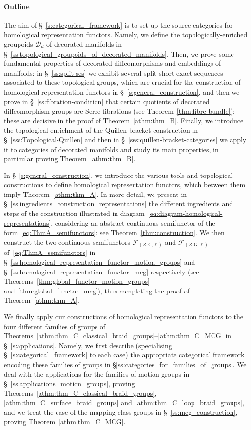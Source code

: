 \documentclass[AHL,Unicode,published]{cedram}
\newcommand{\sF}{\mathscr{F}}
\newcommand{\sG}{\mathsf{G}}
\newcommand{\cD}{\mathcal{D}}
\newcommand{\cF}{\mathcal{F}}
\begin{document}
\paragraph*{Outline}
The aim of \S~\ref{s:categorical_framework} is to set up the source categories for homological representation functors. Namely, we define the topologically-enriched groupoids $\cD_{d}$ of decorated manifolds in \S~\ref{ss:topological_groupoids_of_decorated_manifolds}. Then, we prove some fundamental properties of decorated diffeomorphisms and embeddings of manifolds: in \S~\ref{ss:split-ses} we exhibit several split short exact sequences associated to these topological groups, which are crucial for the construction of homological representation functors in \S~\ref{s:general_construction}, and then we prove in \S~\ref{ss:fibration-condition} that certain quotients of decorated diffeomorphism groups are Serre fibrations (see Theorem~\ref{thm:fibre-bundle}); these are decisive in the proof of Theorem~\ref{athm:thm_B}. Finally, we introduce the topological enrichment of the Quillen bracket construction in \S~\ref{sss:Topological-Quillen} and then in \S~\ref{sss:quillen-bracket-categories} we apply it to categories of decorated manifolds and study its main properties, in particular proving Theorem~\ref{athm:thm_B}.

In \S~\ref{s:general_construction}, we introduce the various tools and topological constructions to define homological representation functors, which between them imply Theorem~\ref{athm:thm_A}. In more detail, we present in \S~\ref{ss:ingredients_construction_representations} the different ingredients and steps of the construction illustrated in diagram~\eqref{eq:diagram-homological-representations}, considering an abstract continuous semifunctor of the form~\eqref{eq:ThmA_semifunctors}; see Theorem~\ref{thm:construction}. We then construct the two continuous semifunctors $\cF_{(Z,\sG,\ell)}$ and $\sF_{(Z,\sG,\ell)}$ of~\eqref{eq:ThmA_semifunctors} in \S~\ref{ss:homological_representation_functor_motion_groups} and \S~\ref{ss:homological_representation_functor_mcg} respectively (see Theorems~\ref{thm:global_functor_motion_groups} and~\ref{thm:global_functor_mcg}), thus completing the proof of Theorem~\ref{athm:thm_A}.

We finally apply our constructions of homological representation functors to the four different families of groups of Theorems~\ref{athm:thm_C_classical_braid_groups}--\ref{athm:thm_C_MCG} in \S~\ref{s:applications}. Namely, we first describe (specialising \S~\ref{s:categorical_framework} to each case) the appropriate categorical framework encoding these families of groups in \S\ref{ss:categories_for_families_of_groups}. We deal with the applications for the families of motion groups in \S~\ref{ss:applications_motion_groups}, proving Theorems~\ref{athm:thm_C_classical_braid_groups}, \ref{athm:thm_C_surface_braid_groups} and~\ref{athm:thm_C_loop_braid_groups}, and we treat the case of the mapping class groups in \S~\ref{ss:mcg_construction}, proving Theorem~\ref{athm:thm_C_MCG}.
\end{document}
